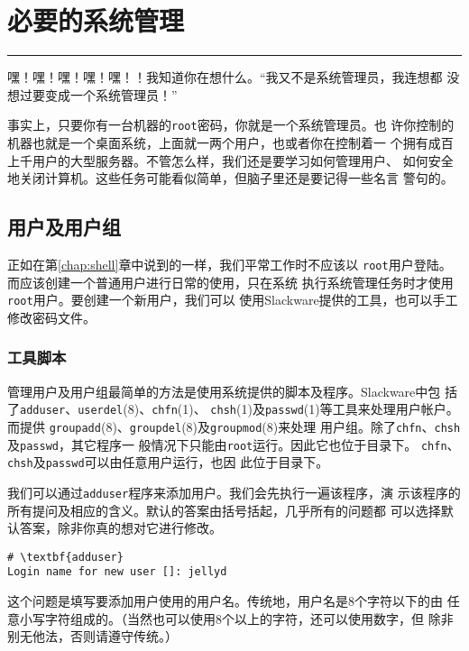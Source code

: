 
\chapter{必要的系统管理}
\label{chap:systemAdministration}

\begin{flushleft}
\rule[0mm]{\textwidth}{.1pt}
\end{flushleft}

嘿！嘿！嘿！嘿！嘿！！我知道你在想什么。``我又不是系统管理员，我连想都
没想过要变成一个系统管理员！''

事实上，只要你有一台机器的\texttt{root}密码，你就是一个系统管理员。也
许你控制的机器也就是一个桌面系统，上面就一两个用户，也或者你在控制着一
个拥有成百上千用户的大型服务器。不管怎么样，我们还是要学习如何管理用户、
如何安全地关闭计算机。这些任务可能看似简单，但脑子里还是要记得一些名言
警句的。

\section{用户及用户组}
\label{sec:systemAdministration:usersAndGroups}
正如在第\ref{chap:shell}章中说到的一样，我们平常工作时不应该以
\texttt{root}用户登陆。而应该创建一个普通用户进行日常的使用，只在系统
执行系统管理任务时才使用\texttt{root}用户。要创建一个新用户，我们可以
使用Slackware提供的工具，也可以手工修改密码文件。

\subsection{工具脚本}
\label{sec:systemAdministration:usersAndGroups:suppliedScripts}
管理用户及用户组最简单的方法是使用系统提供的脚本及程序。Slackware中包
括了\texttt{adduser}、\texttt{userdel}(8)、\texttt{chfn}(1)、
\texttt{chsh}(1)及\texttt{passwd}(1)等工具来处理用户帐户。而提供
\texttt{groupadd}(8)、\texttt{groupdel}(8)及\texttt{groupmod}(8)来处理
用户组。除了\texttt{chfn}、\texttt{chsh}及\texttt{passwd}，其它程序一
般情况下只能由\texttt{root}运行。因此它也位于目录下。
\texttt{chfn}、\texttt{chsh}及\texttt{passwd}可以由任意用户运行，也因
此位于目录下。

我们可以通过\texttt{adduser}程序来添加用户。我们会先执行一遍该程序，演
示该程序的所有提问及相应的含义。默认的答案由括号括起，几乎所有的问题都
可以选择默认答案，除非你真的想对它进行修改。

\begin{Verbatim}[frame=single, commandchars=\\\{\}]
# \textbf{adduser}
Login name for new user []: jellyd
\end{Verbatim}
这个问题是填写要添加用户使用的用户名。传统地，用户名是8个字符以下的由
任意小写字符组成的。（当然也可以使用8个以上的字符，还可以使用数字，但
除非别无他法，否则请遵守传统。）

